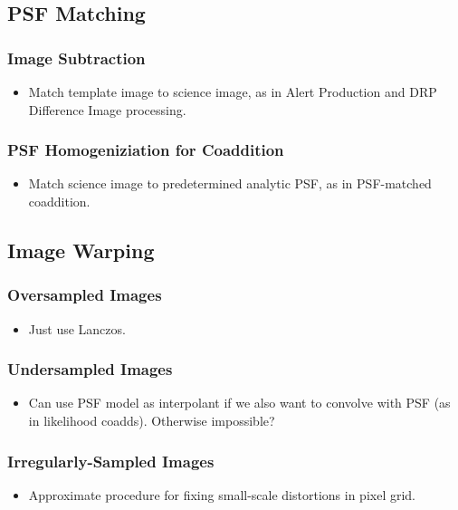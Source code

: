 \subsection{PSF Matching}
\subsubsection{Image Subtraction}
\begin{itemize}
\item Match template image to science image, as in Alert Production and DRP Difference Image processing.
\end{itemize}
\subsubsection{PSF Homogeniziation for Coaddition}
\begin{itemize}
\item Match science image to predetermined analytic PSF, as in PSF-matched coaddition.
\end{itemize}

\subsection{Image Warping}
\subsubsection{Oversampled Images}
\begin{itemize}
\item Just use Lanczos.
\end{itemize}
\subsubsection{Undersampled Images}
\begin{itemize}
\item Can use PSF model as interpolant if we also want to convolve with PSF (as in likelihood coadds).  Otherwise impossible?
\end{itemize}
\subsubsection{Irregularly-Sampled Images}
\begin{itemize}
\item Approximate procedure for fixing small-scale distortions in pixel grid.
\end{itemize}

